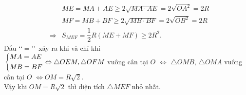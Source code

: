 \begin{bt}
{\begin{enumerate}
{\begin{eqnarray*}
 & &ME = MA + AE \ge 2\sqrt{MA\cdot AE} = 2\sqrt{OA^2}= 2R\\
& & MF = MB + BF \ge 2\sqrt{MB\cdot BF} = 2\sqrt{OB^2}= 2R\\
&\Rightarrow& S_{MEF}=\dfrac{1}{2}R(ME+MF)\ge 2R^2.
\end{eqnarray*}
}
Dấu \lq \lq $=$\rq\rq \, xảy ra khi và chỉ khi\\
$\left\{\begin{aligned}&MA=AE\\&MB=BF\end{aligned}\right.\Leftrightarrow \triangle OEM, \triangle OFM$ vuông cân tại $O$ $\Leftrightarrow$ $\triangle OMB$, $\triangle OMA$ vuông cân tại $O$ $\Leftrightarrow OM = R\sqrt{2}$.\\
Vậy khi $OM = R\sqrt{2}$ thì diện tích $\triangle MEF$ nhỏ nhất.
\end{enumerate}

}
\end{bt}

